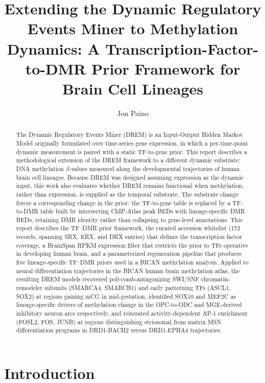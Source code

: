 \documentclass[sigconf,nonacm]{acmart}
\title{Extending the Dynamic Regulatory Events Miner to Methylation
       Dynamics: A Transcription-Factor-to-DMR Prior Framework for
       Brain Cell Lineages}
\author{Jon Paino}
\affiliation{%
  \institution{University of California, Los Angeles}
  \city{Los Angeles}
  \state{California}
  \country{USA}}
\begin{document}
\begin{abstract}
The Dynamic Regulatory Events Miner (DREM) is an Input-Output Hidden
Markov Model originally formulated over time-series gene expression,
in which a per-time-point dynamic measurement is paired with a static
TF-to-gene prior. This report describes a methodological extension of
the DREM framework to a different dynamic substrate: DNA methylation
$\beta$-values measured along the developmental trajectories of human
brain cell lineages. Because DREM was designed assuming expression as
the dynamic input, this work also evaluates whether DREM remains
functional when methylation, rather than expression, is supplied as
the temporal substrate. The substrate change forces a corresponding
change in the prior: the TF-to-gene table is replaced by a TF-to-DMR
table built by intersecting ChIP-Atlas peak BEDs with
lineage-specific DMR BEDs, retaining DMR identity rather than
collapsing to gene-level annotations. This report describes the
TF--DMR prior framework, the curated accession whitelist (172 records,
spanning SRX, ERX, and DRX entries) that defines the transcription
factor coverage, a BrainSpan RPKM expression filter that restricts the
prior to TFs operative in developing human brain, and a parameterized
regeneration pipeline that produces five lineage-specific TF--DMR
priors used in a BICAN methylation analysis. Applied to neural
differentiation trajectories in the BICAN human brain methylation
atlas, the resulting DREM models recovered polycomb-antagonizing
SWI/SNF chromatin-remodeler subunits (SMARCA4, SMARCB1) and early
patterning TFs (ASCL1,
SOX2) at regions gaining mCG in mid-gestation, identified SOX10 and
MEF2C as lineage-specific drivers of methylation change in the
OPC-to-ODC and MGE-derived inhibitory neuron arcs respectively, and
reiterated activity-dependent AP-1 enrichment (FOSL2, FOS, JUNB) at
regions distinguishing striosomal from matrix MSN differentiation
programs in DRD1-BACH2 versus DRD1-EPHA4 trajectories.

\end{abstract}

\maketitle

\section{Introduction}
\label{sec:intro}
\end{document}
